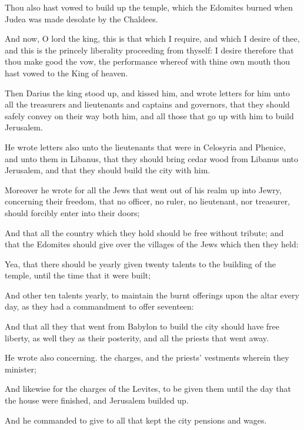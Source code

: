 {\par }{\PP {}Thou also hast vowed to build up the temple, which the Edomites burned when Judea was made desolate by the Chaldees.
\par }{\PP {}And now, O lord the king, this is that which I require, and which I desire of thee, and this is the princely liberality proceeding from thyself: I desire therefore that thou make good the vow, the performance whereof with thine own mouth thou hast vowed to the King of heaven.
\par }{\PP {}Then Darius the king stood up, and kissed him, and wrote letters for him unto all the treasurers and lieutenants and captains and governors, that they should safely convey on their way both him, and all those that go up with him to build Jerusalem.
\par }{\PP {}He wrote letters also unto the lieutenants that were in Celosyria and Phenice, and unto them in Libanus, that they should bring cedar wood from Libanus unto Jerusalem, and that they should build the city with him.
\par }{\PP {}Moreover he wrote for all the Jews that went out of his realm up into Jewry, concerning their freedom, that no officer, no ruler, no lieutenant, nor treasurer, should forcibly enter into their doors;
\par }{\PP {}And that all the country which they hold should be free without tribute; and that the Edomites should give over the villages of the Jews which then they held:
\par }{\PP {}Yea, that there should be yearly given twenty talents to the building of the temple, until the time that it were built;
\par }{\PP {}And other ten talents yearly, to maintain the burnt offerings upon the altar every day, as they had a commandment to offer seventeen:
\par }{\PP {}And that all they that went from Babylon to build the city should have free liberty, as well they as their posterity, and all the priests that went away.
\par }{\PP {}He wrote also concerning. the charges, and the priests’ vestments wherein they minister;
\par }{\PP {}And likewise for the charges of the Levites, to be given them until the day that the house were finished, and Jerusalem builded up.
\par }{\PP {}And he commanded to give to all that kept the city pensions and wages.
}
